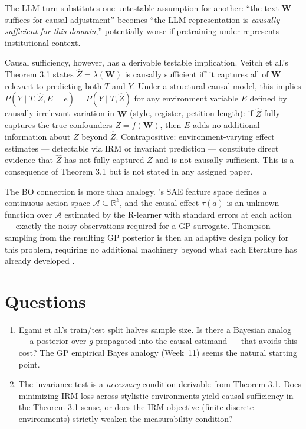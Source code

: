 \documentclass[11pt,twoside]{article}
\begin{document}
The LLM turn substitutes one untestable assumption for another: ``the text $\mathbf{W}$ suffices for causal adjustment'' becomes ``the LLM representation is \textit{causally sufficient for this domain},'' potentially worse if pretraining under-represents institutional context.

Causal sufficiency, however, has a derivable testable implication. Veitch et al.'s Theorem 3.1 states $\hat{Z} = \lambda(\mathbf{W})$ is causally sufficient iff it captures all of $\mathbf{W}$ relevant to predicting both $T$ and $Y$. Under a structural causal model, this implies $P(Y \mid T, \hat{Z}, E{=}e) = P(Y \mid T, \hat{Z})$ for any environment variable $E$ defined by causally irrelevant variation in $\mathbf{W}$ (style, register, petition length): if $\hat{Z}$ fully captures the true confounders $Z = f(\mathbf{W})$, then $E$ adds no additional information about $Z$ beyond $\hat{Z}$. Contrapositive: environment-varying effect estimates --- detectable via IRM \citep{arjovsky2019irm} or invariant prediction \citep{peters2016icp} --- constitute direct evidence that $\hat{Z}$ has not fully captured $Z$ and is not causally sufficient. This is a consequence of Theorem 3.1 but is not stated in any assigned paper.

The BO connection is more than analogy. \citet{feldman2026sae}'s SAE feature space defines a continuous action space $\mathcal{A}\subseteq\mathbb{R}^k$, and the causal effect $\tau(a)$ is an unknown function over $\mathcal{A}$ estimated by the R-learner with standard errors at each action --- exactly the noisy observations required for a GP surrogate. Thompson sampling from the resulting GP posterior is then an adaptive design policy for this problem, requiring no additional machinery beyond what each literature has already developed \citep{aglietti2021dcbo}.

\section*{Questions}
\begin{enumerate}
    \item Egami et al.'s train/test split halves sample size. Is there a Bayesian analog --- a posterior over $g$ propagated into the causal estimand --- that avoids this cost? The GP empirical Bayes analogy (Week~11) seems the natural starting point.
    \item The invariance test is a \textit{necessary} condition derivable from Theorem 3.1. Does minimizing IRM loss across stylistic environments yield causal sufficiency in the Theorem 3.1 sense, or does the IRM objective (finite discrete environments) strictly weaken the measurability condition?
\end{enumerate}
\end{document}
